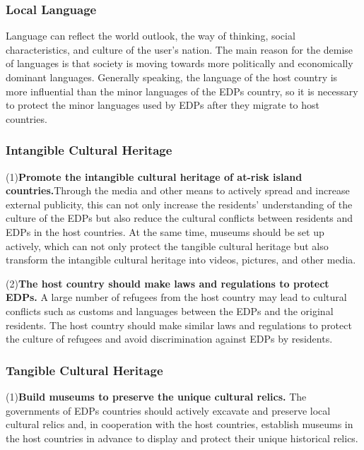 \documentclass[12pt]{article}  %
\begin{document}
\subsubsection{Local Language}
Language can reflect the world outlook, the way of thinking, social characteristics, and culture of the user's nation. The main reason for the demise of languages is that society is moving towards more politically and economically dominant languages. Generally speaking, the language of the host country is more influential than the minor languages of the EDPs country, so it is necessary to protect the minor languages used by EDPs after they migrate to host countries.

\subsubsection{Intangible Cultural Heritage}

(1)\textbf{Promote the intangible cultural heritage of at-risk island countries.}Through the media and other means to actively spread and increase external publicity, this can not only increase the residents' understanding of the culture of the EDPs but also reduce the cultural conflicts between residents and EDPs in the host countries. At the same time, museums should be set up actively, which can not only protect the tangible cultural heritage but also transform the intangible cultural heritage into videos, pictures, and other media.


(2)\textbf{The host country should make laws and regulations to protect EDPs.} A large number of refugees from the host country may lead to cultural conflicts such as customs and languages between the EDPs and the original residents. The host country should make similar laws and regulations to protect the culture of refugees and avoid discrimination against EDPs by residents.







\subsubsection{Tangible Cultural Heritage}

(1)\textbf{Build museums to preserve the unique cultural relics.} The governments of EDPs countries should actively excavate and preserve local cultural relics and, in cooperation with the host countries, establish museums in the host countries in advance to display and protect their unique historical relics.
\end{document}
